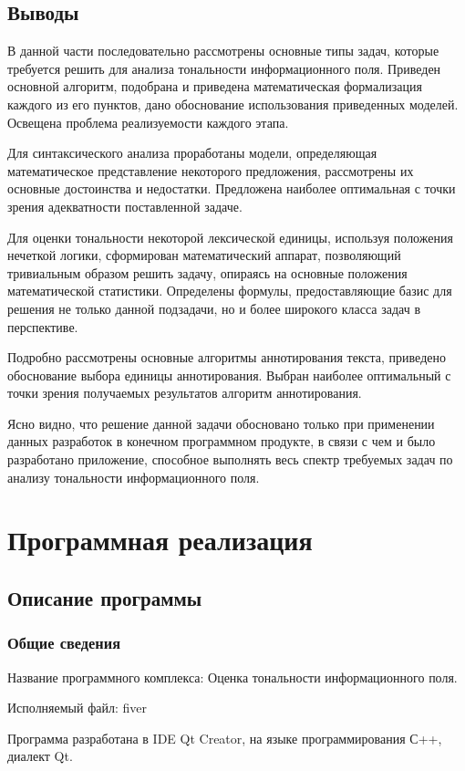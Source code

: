 \documentclass[a4paper,14pt,russian]{extreport}
\begin{document}
\section{Выводы}

В данной части последовательно рассмотрены основные типы задач, которые требуется решить для анализа тональности информационного поля. Приведен основной алгоритм, подобрана и приведена математическая формализация каждого из его пунктов, дано обоснование использования приведенных моделей. Освещена проблема реализуемости каждого этапа.

Для синтаксического анализа проработаны модели, определяющая математическое представление некоторого предложения, рассмотрены их основные достоинства и недостатки. Предложена наиболее оптимальная с точки зрения адекватности поставленной задаче.

Для оценки тональности некоторой лексической единицы, используя положения нечеткой логики, сформирован математический аппарат, позволяющий тривиальным образом решить задачу, опираясь на основные положения математической статистики. Определены формулы, предоставляющие базис для решения не только данной подзадачи, но и более широкого класса задач в перспективе.

Подробно рассмотрены основные алгоритмы аннотирования текста, приведено обоснование выбора единицы аннотирования. Выбран наиболее оптимальный с точки зрения получаемых результатов алгоритм аннотирования.

Ясно видно, что решение данной задачи обосновано только при применении данных разработок в конечном программном продукте, в связи с чем и было разработано приложение, способное выполнять весь спектр требуемых задач по анализу тональности информационного поля.
\newpage
\chapter{Программная реализация}
\section{Описание программы}
\subsection{Общие сведения}

Название программного комплекса: Оценка тональности информационного поля.

Исполняемый файл: fiver

Программа разработана в IDE Qt Creator, на языке программирования С++, диалект Qt.
\end{document}
